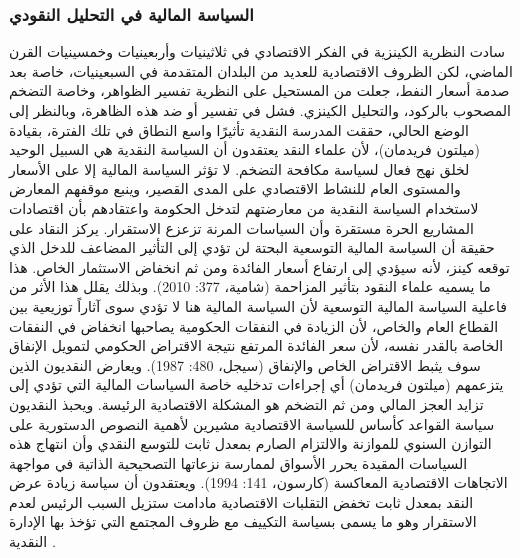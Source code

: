 \documentclass[10pt,a4paper]{report}
\begin{document}
\begin{doublespacing}
\subsubsection{السياسة المالية في التحليل النقودي}
سادت النظرية الكينزية في الفكر الاقتصادي في ثلاثينيات وأربعينيات وخمسينيات القرن الماضي، لكن الظروف الاقتصادية للعديد من البلدان المتقدمة في السبعينيات، خاصة بعد صدمة أسعار النفط، جعلت من المستحيل على النظرية تفسير الظواهر، وخاصة التضخم المصحوب بالركود، والتحليل الكينزي. فشل في تفسير أو ضد هذه الظاهرة، وبالنظر إلى الوضع الحالي، حققت المدرسة النقدية تأثيرًا واسع النطاق في تلك الفترة، بقيادة {(ميلتون فريدمان)}، لأن علماء النقد يعتقدون أن السياسة النقدية هي السبيل الوحيد لخلق نهج فعال لسياسة مكافحة التضخم. لا تؤثر السياسة المالية إلا على الأسعار والمستوى العام للنشاط الاقتصادي على المدى القصير، وينبع موقفهم المعارض لاستخدام السياسة النقدية من معارضتهم لتدخل الحكومة واعتقادهم بأن اقتصادات المشاريع الحرة مستقرة وأن السياسات المرنة تزعزع الاستقرار. يركز النقاد على حقيقة أن السياسة المالية التوسعية البحتة لن تؤدي إلى التأثير المضاعف للدخل الذي توقعه كينز، لأنه سيؤدي إلى ارتفاع أسعار الفائدة ومن ثم انخفاض الاستثمار الخاص. هذا ما يسميه علماء النقود بتأثير المزاحمة {(شامية، 377: 2010)}. وبذلك يقلل هذا الأثر من فاعلية السياسة المالية التوسعية لأن السياسة المالية هنا لا تؤدي سوى آثاراً توزيعية بين القطاع العام والخاص، لأن الزيادة في النفقات الحكومية يصاحبها انخفاض في النفقات الخاصة بالقدر نفسه، لأن سعر الفائدة المرتفع نتيجة الاقتراض الحكومي لتمويل الإنفاق سوف يثبط الاقتراض الخاص والإنفاق {(سيجل، 480: 1987)}. ويعارض النقديون الذين يتزعمهم {(ميلتون فريدمان)} أي إجراءات تدخليه خاصة السياسات المالية التي تؤدي إلى تزايد العجز المالي ومن ثم التضخم هو المشكلة الاقتصادية الرئيسة. ويحبذ النقديون سياسة القواعد كأساس للسياسة الاقتصادية مشيرين لأهمية النصوص الدستورية على التوازن السنوي للموازنة والالتزام الصارم بمعدل ثابت للتوسع النقدي وأن انتهاج هذه السياسات المقيدة يحرر الأسواق لممارسة نزعاتها التصحيحية الذاتية في مواجهة الاتجاهات الاقتصادية المعاكسة {(كارسون، 141: 1994)}. ويعتقدون أن سياسة زيادة عرض النقد بمعدل ثابت تخفض التقلبات الاقتصادية مادامت ستزيل السبب الرئيس لعدم الاستقرار وهو ما يسمى بسياسة التكييف مع ظروف المجتمع التي تؤخذ بها الإدارة النقدية .

\end{doublespacing}
\end{document}
